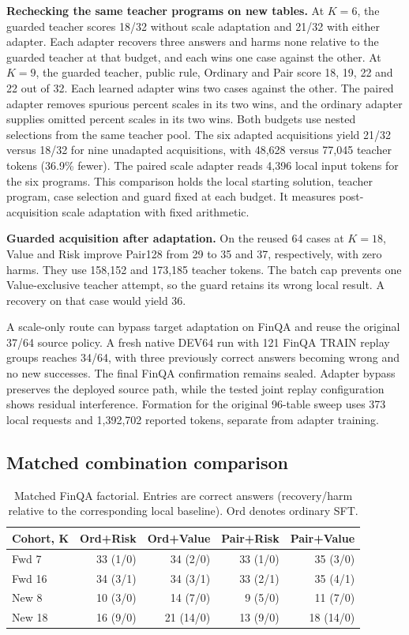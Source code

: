\documentclass[10pt,letterpaper,conference]{IEEEtran}
\begin{document}
\textbf{Rechecking the same teacher programs on new tables.} At \(K=6\), the guarded teacher scores 18/32 without scale adaptation and 21/32 with either adapter. Each adapter recovers three answers and harms none relative to the guarded teacher at that budget, and each wins one case against the other. At \(K=9\), the guarded teacher, public rule, Ordinary and Pair score 18, 19, 22 and 22 out of 32. Each learned adapter wins two cases against the other. The paired adapter removes spurious percent scales in its two wins, and the ordinary adapter supplies omitted percent scales in its two wins. Both budgets use nested selections from the same teacher pool. The six adapted acquisitions yield 21/32 versus 18/32 for nine unadapted acquisitions, with 48,628 versus 77,045 teacher tokens (36.9\% fewer). The paired scale adapter reads 4,396 local input tokens for the six programs. This comparison holds the local starting solution, teacher program, case selection and guard fixed at each budget. It measures post-acquisition scale adaptation with fixed arithmetic.

\textbf{Guarded acquisition after adaptation.} On the reused 64 cases at \(K=18\), Value and Risk improve Pair128 from 29 to 35 and 37, respectively, with zero harms. They use 158,152 and 173,185 teacher tokens. The batch cap prevents one Value-exclusive teacher attempt, so the guard retains its wrong local result. A recovery on that case would yield 36.

A scale-only route can bypass target adaptation on FinQA and reuse the original 37/64 source policy. A fresh native DEV64 run with 121 FinQA TRAIN replay groups reaches 34/64, with three previously correct answers becoming wrong and no new successes. The final FinQA confirmation remains sealed. Adapter bypass preserves the deployed source path, while the tested joint replay configuration shows residual interference. Formation for the original 96-table sweep uses 373 local requests and 1,392,702 reported tokens, separate from adapter training.

\subsection{Matched combination comparison}\label{matched-combination-comparison}

\begin{table}[!t]
\centering
\caption{Matched FinQA factorial. Entries are correct answers (recovery/harm relative to the corresponding local baseline). Ord denotes ordinary SFT.}
\label{tab:4}
\begin{tabular}{@{}lrrrr@{}}
\toprule
Cohort, K & Ord+Risk & Ord+Value & Pair+Risk & Pair+Value \\
\midrule
Fwd 7 & 33 (1/0) & 34 (2/0) & 33 (1/0) & 35 (3/0) \\
Fwd 16 & 34 (3/1) & 34 (3/1) & 33 (2/1) & 35 (4/1) \\
New 8 & 10 (3/0) & 14 (7/0) & 9 (5/0) & 11 (7/0) \\
New 18 & 16 (9/0) & 21 (14/0) & 13 (9/0) & 18 (14/0) \\
\bottomrule
\end{tabular}
\end{table}
\end{document}
